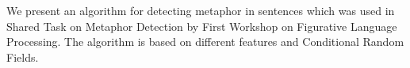 We present an algorithm for detecting metaphor in sentences which was used in Shared Task on Metaphor Detection by First Workshop on Figurative Language Processing. The algorithm is based on different features and Conditional Random Fields.
